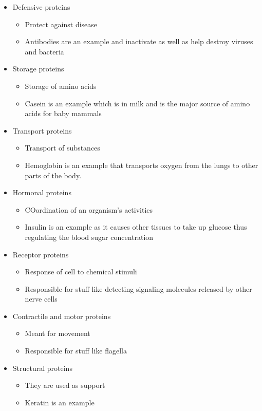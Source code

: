 \documentclass[letterpaper]{article}
\begin{document}
\begin{itemize}
\begin{itemize}
\item Defensive proteins

\begin{itemize}
\item Protect against disease
\item Antibodies are an example and inactivate as well as help destroy
viruses and bacteria
\end{itemize}

\item Storage proteins

\begin{itemize}
\item Storage of amino acids
\item Casein is an example which is in milk and is the major source of
amino acids for baby mammals
\end{itemize}

\item Transport proteins

\begin{itemize}
\item Transport of substances
\item Hemoglobin is an example that transports oxygen from the lungs to
other parts of the body.
\end{itemize}

\item Hormonal proteins

\begin{itemize}
\item COordination of an organism's activities
\item Insulin is an example as it causes other tissues to take up
glucose thus regulating the blood sugar concentration
\end{itemize}

\item Receptor proteins

\begin{itemize}
\item Response of cell to chemical stimuli
\item Responsible for stuff like detecting signaling molecules released
by other nerve cells
\end{itemize}

\item Contractile and motor proteins

\begin{itemize}
\item Meant for movement
\item Responsible for stuff like flagella
\end{itemize}

\item Structural proteins

\begin{itemize}
\item They are used as support
\item Keratin is an example
\end{itemize}
\end{itemize}
\end{itemize}
\end{document}
